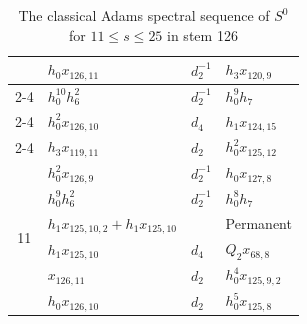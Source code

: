 \documentclass{amsart}
\numberwithin{equation}{section}
\begin{document}
\begin{table}
{\begin{tabular}{|c|l|l|l|}
 & $h_0x_{126,11}$ & $d_{2}^{-1}$ & $h_3x_{120,9}$ \\\cline{2-4}
 & $h_0^{10}h_6^2$ & $d_{2}^{-1}$ & $h_0^9h_7$ \\\cline{2-4}
 & $h_0^2x_{126,10}$ & $d_{4}$ & $h_1x_{124,15}$ \\\cline{2-4}
 & $h_3x_{119,11}$ & $d_{2}$ & $h_0^2x_{125,12}$ \\\hline\hline
\multirow{6}{*}{11} & $h_0^2x_{126,9}$ & $d_{2}^{-1}$ & $h_0x_{127,8}$ \\\cline{2-4}
 & $h_0^9h_6^2$ & $d_{2}^{-1}$ & $h_0^8h_7$ \\\cline{2-4}
 & $h_1x_{125,10,2}+h_1x_{125,10}$ & & Permanent \\\cline{2-4}
 & $h_1x_{125,10}$ & $d_{4}$ & $Q_2x_{68,8}$ \\\cline{2-4}
 & $x_{126,11}$ & $d_{2}$ & $h_0^4x_{125,9,2}$ \\\cline{2-4}
 & $h_0x_{126,10}$ & $d_{2}$ & $h_0^5x_{125,8}$ \\\hline
 \end{tabular}}
\caption{The classical Adams spectral sequence of $S^0$ for $11 \le s \le 25$ in stem 126}
\label{Table:S126.11}
\end{table}
\end{document}
